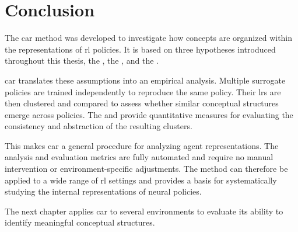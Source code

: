 \section{Conclusion}
\label{sec:clustering_agent_representation_conclusion}

The \gls{car} method was developed to investigate how concepts are organized within the representations of \gls{rl} policies.
It is based on three hypotheses introduced throughout this thesis, the \MechanisticHypothesisName, the \ConceptHypothesisName, and the \RepresentationConvergenceHypothesisName.

\gls{car} translates these assumptions into an empirical analysis.
Multiple surrogate policies are trained independently to reproduce the same policy.
Their \glspl{lr} are then clustered and compared to assess whether similar conceptual structures emerge across policies.
The \ClusteringUniversalityName and \AbstractionScoreName provide quantitative measures for evaluating the consistency and abstraction of the resulting clusters.

This makes \gls{car} a general procedure for analyzing agent representations.
The analysis and evaluation metrics are fully automated and require no manual intervention or environment-specific adjustments.
The method can therefore be applied to a wide range of \gls{rl} settings and provides a basis for systematically studying the internal representations of neural policies.

The next chapter applies \gls{car} to several environments to evaluate its ability to identify meaningful conceptual structures.


